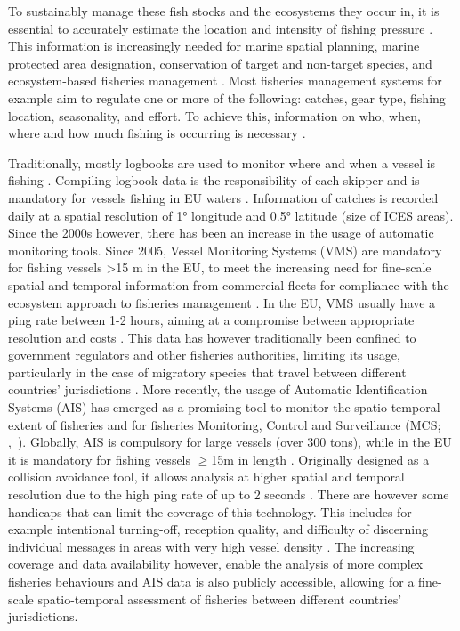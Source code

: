 \medskip

To sustainably manage these fish stocks and the ecosystems they occur in, it is essential to
accurately estimate the location and intensity of fishing pressure
\citep{piet_fishing_indicators,russo_indicators,fishing_grounds_greece}. This information is
increasingly needed for marine spatial planning, marine protected area designation, conservation of
target and non-target species, and ecosystem-based fisheries management
\citep{vespe_map_2016,henrique_effort_estimation,tidd_importance_effort,gerritsen2010,ais_mpa_designation,ais_bycatch,ais_bird_bycatch}.
Most fisheries management systems for example aim to regulate one or more of the following:
catches, gear type, fishing location, seasonality, and effort. To achieve this, information on who,
when, where and how much fishing is occurring is necessary \citep{orofino_transparency}.

\medskip

Traditionally, mostly logbooks are used to monitor where and when a vessel is fishing
\citep{HINTZEN201231}. Compiling logbook data is the responsibility of each skipper and is
mandatory for vessels fishing in EU waters \citep{euregulation1993}. Information of catches is
recorded daily at a spatial resolution of 1° longitude and 0.5° latitude (size of ICES areas).
Since the 2000s however, there has been an increase in the usage of automatic monitoring tools.
Since 2005, Vessel Monitoring Systems (VMS) are mandatory for fishing vessels >15 m in the EU, to
meet the increasing need for fine-scale spatial and temporal information from commercial fleets for
compliance with the ecosystem approach to fisheries management
\citep{ec2003regulation,gerritsen2010}. In the EU, VMS usually have a ping rate between 1-2 hours,
aiming at a compromise between appropriate resolution and costs \citep{shepperson}. This data has
however traditionally been confined to government regulators and other fisheries authorities,
limiting its usage, particularly in the case of migratory species that travel between different
countries' jurisdictions \citep{orofino_transparency,confidentiality}. More recently, the usage of
Automatic Identification Systems (AIS) has emerged as a promising tool to monitor the
spatio-temporal extent of fisheries and for fisheries Monitoring, Control and Surveillance (MCS;
\mbox{\citeauthor{zhang_ais_mcs}, \citeyear{zhang_ais_mcs}}). Globally, AIS is compulsory for large
vessels (over 300 tons), while in the EU it is mandatory for fishing vessels $\ge$15m in length
\citep{ec2011directive}. Originally designed as a collision avoidance tool, it allows analysis at
higher spatial and temporal resolution due to the high ping rate of up to 2 seconds
\citep{taconet2019global,kontasvesselupdate}. There are however some handicaps that can limit the
coverage of this technology. This includes for example intentional turning-off, reception quality,
and difficulty of discerning individual messages in areas with very high vessel density
\citep{taconet2019global}. The increasing coverage and data availability however, enable the
analysis of more complex fisheries behaviours \citep{natale} and AIS data is also publicly
accessible, allowing for a fine-scale spatio-temporal assessment of fisheries between different
countries' jurisdictions.

